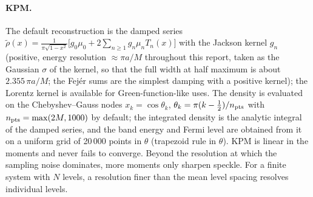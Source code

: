 \documentclass[reprint,nofootinbib,superscriptaddress,amsmath,amssymb,aps,prb,floatfix]{revtex4-2}
\begin{document}
\paragraph*{KPM.}
The default reconstruction is the damped series $\tilde\rho(x)=\frac{1}{\pi\sqrt{1-x^2}}\bigl[g_0\mu_0+2\sum_{n\ge1}g_n\mu_nT_n(x)\bigr]$ with the Jackson kernel $g_n$ \cite{jackson,kpm} (positive, energy resolution $\approx\pi a/M$ throughout this report, taken as the Gaussian $\sigma$ of the kernel, so that the full width at half maximum is about $2.355\,\pi a/M$; the Fej\'er sums \cite{fejer,courant} are the simplest damping with a positive kernel); the Lorentz kernel is available for Green-function-like uses.
The density is evaluated on the Chebyshev--Gauss nodes $x_k=\cos\theta_k$, $\theta_k=\pi(k-\tfrac12)/n_{\rm pts}$ with $n_{\rm pts}=\max(2M,1000)$ by default; the integrated density is the analytic integral of the damped series, and the band energy and Fermi level are obtained from it on a uniform grid of 20\,000 points in $\theta$ (trapezoid rule in $\theta$).
KPM is linear in the moments and never fails to converge. Beyond the resolution at which the sampling noise dominates, more moments only sharpen speckle. For a finite system with $N$ levels, a resolution finer than the mean level spacing resolves individual levels.
\end{document}
